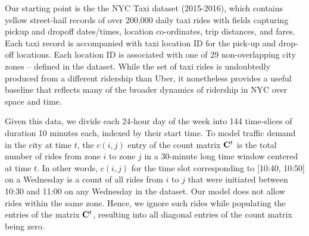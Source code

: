 Our starting point is the the NYC Taxi  dataset (2015-2016), which
contains yellow street-hail records of over 200,000 daily taxi rides with fields capturing pickup and dropoff dates/times, 
location co-ordinates, trip distances, and fares.
Each taxi record is accompanied with taxi location ID for the pick-up and drop-off locations. 
Each location ID is associated with one of 29 non-overlapping city zones -- defined in the
dataset.  While the set of taxi rides is undoubtedly produced from a different ridership than Uber, 
it nonetheless provides a useful baseline that reflects many of the broader dynamics of ridership in 
NYC over space and time.  %


Given this data, we divide each 24-hour day of the week into 144 time-slices of duration 10 minutes each, indexed by their start 
time.  To model traffic demand in the city at time $t$, the $c(i,j)$ entry of the count matrix ${\mathbf{C}}^t$ is the total 
number of rides from zone $i$ to zone $j$ in a 30-minute long time window centered at time $t$. In other words, $c(i,j)$ for the time slot corresponding
to [10:40, 10:50] on a Wednesday is a count of all rides from $i$ to $j$ that were initiated between 10:30 and 11:00 
on any Wednesday in the dataset. Our model does not allow rides within the same zone. Hence, we ignore such rides while populating the entries of the matrix ${\mathbf{C}}^t$, resulting into all diagonal entries of the count matrix being zero.


